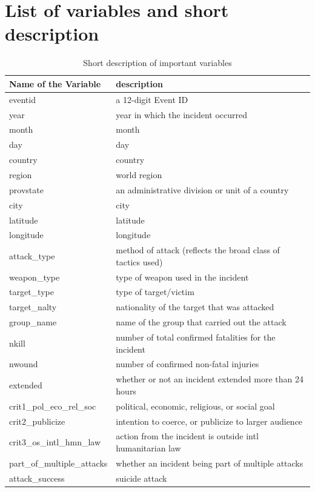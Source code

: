 \documentclass[11pt,oneside,a4paper]{reedthesis}
\begin{document}
\section{List of variables and short
description}\label{list-of-variables-and-short-description}
\begin{table}[H]

\caption{\label{tab:unnamed-chunk-141}Short description of important variables}
\begin{tabular}[t]{ll}
\toprule
Name of the Variable & description\\
\midrule
eventid & a 12-digit Event ID\\
year & year in which the incident occurred\\
month & month\\
day & day\\
country & country\\
\addlinespace
region & world region\\
provstate & an administrative division or unit of a country\\
city & city\\
latitude & latitude\\
longitude & longitude\\
\addlinespace
attack\_type & method of attack (reflects the broad class of tactics used)\\
weapon\_type & type of weapon used in the incident\\
target\_type & type of target/victim\\
target\_nalty & nationality of the target that was attacked\\
group\_name & name of the group that carried out the attack\\
\addlinespace
nkill & number of total confirmed fatalities for the incident\\
nwound & number of confirmed non-fatal injuries\\
extended & whether or not an incident extended more than 24 hours\\
crit1\_pol\_eco\_rel\_soc & political, economic, religious, or social goal\\
crit2\_publicize & intention to coerce, or publicize to larger audience\\
\addlinespace
crit3\_os\_intl\_hmn\_law & action from the incident is outside intl humanitarian law\\
part\_of\_multiple\_attacks & whether an incident being part of multiple attacks\\
attack\_success & suicide attack\\

\end{tabular}
\end{table}
\end{document}
